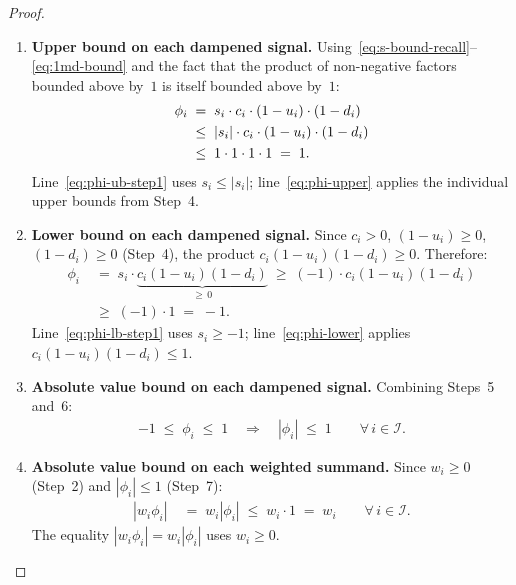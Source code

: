 \documentclass[12pt,openany]{book}
\numberwithin{equation}{chapter}
\theoremstyle{plain}
\theoremstyle{definition}
\theoremstyle{remark}
\numberwithin{equation}{chapter}
\theoremstyle{plain}
\begin{document}
\begin{proof}
\begin{enumerate}
  \item \textbf{Upper bound on each dampened signal.}
        Using~\eqref{eq:s-bound-recall}--\eqref{eq:1md-bound}
        and the fact that the product of non-negative factors
        bounded above by~$1$ is itself bounded above by~$1$:
        \begin{align}
          \phi_i
          &\;=\; s_i \cdot c_i \cdot (1-u_i) \cdot (1-d_i)
          \notag\\
          &\;\leq\; |s_i| \cdot c_i \cdot (1-u_i) \cdot (1-d_i)
          \label{eq:phi-ub-step1}\\
          &\;\leq\; 1 \cdot 1 \cdot 1 \cdot 1
          \;=\; 1.
          \label{eq:phi-upper}
        \end{align}
        Line~\eqref{eq:phi-ub-step1} uses $s_i \leq |s_i|$;
        line~\eqref{eq:phi-upper} applies the individual upper
        bounds from Step~4.

  \item \textbf{Lower bound on each dampened signal.}
        Since $c_i > 0$, $(1-u_i) \geq 0$, $(1-d_i) \geq 0$
        (Step~4), the product
        $c_i(1-u_i)(1-d_i) \geq 0$.
        Therefore:
        \begin{align}
          \phi_i
          &\;=\; s_i \cdot \underbrace{c_i(1-u_i)(1-d_i)}_{\geq\,0}
          \;\geq\; (-1) \cdot c_i(1-u_i)(1-d_i)
          \label{eq:phi-lb-step1}\\
          &\;\geq\; (-1) \cdot 1
          \;=\; -1.
          \label{eq:phi-lower}
        \end{align}
        Line~\eqref{eq:phi-lb-step1} uses $s_i \geq -1$;
        line~\eqref{eq:phi-lower} applies
        $c_i(1-u_i)(1-d_i) \leq 1$.

  \item \textbf{Absolute value bound on each dampened signal.}
        Combining Steps~5 and~6:
        \begin{align}
          -1 \;\leq\; \phi_i \;\leq\; 1
          \quad\Longrightarrow\quad
          |\phi_i| \;\leq\; 1
          \qquad \forall\, i \in \mathcal{I}.
          \label{eq:phi-abs}
        \end{align}

  \item \textbf{Absolute value bound on each weighted summand.}
        Since $w_i \geq 0$ (Step~2) and $|\phi_i| \leq 1$
        (Step~7):
        \begin{align}
          |w_i \phi_i|
          &\;=\; w_i |\phi_i|
          \;\leq\; w_i \cdot 1
          \;=\; w_i
          \qquad \forall\, i \in \mathcal{I}.
          \label{eq:wi-phi-bound}
        \end{align}
        The equality $|w_i \phi_i| = w_i |\phi_i|$ uses $w_i \geq 0$.


\end{enumerate}
\end{proof}
\end{document}
